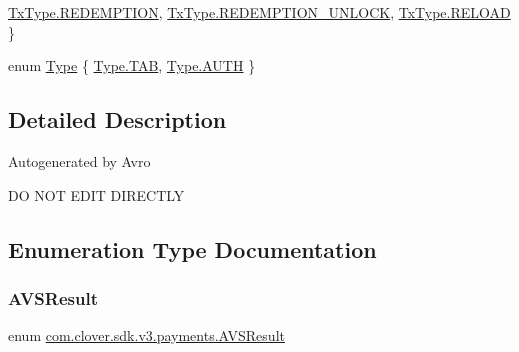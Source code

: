 \begin{DoxyCompactItemize}
\newline
\hyperlink{namespacecom_1_1clover_1_1sdk_1_1v3_1_1payments_ad4411d3ee4c0997584ff0df20764ba06a02c2455ac1707517c5138fb29aca4958}{Tx\+Type.\+R\+E\+D\+E\+M\+P\+T\+I\+ON}, 
\hyperlink{namespacecom_1_1clover_1_1sdk_1_1v3_1_1payments_ad4411d3ee4c0997584ff0df20764ba06a78a2c98bf2601eca6c830e18f06b5bdf}{Tx\+Type.\+R\+E\+D\+E\+M\+P\+T\+I\+O\+N\+\_\+\+U\+N\+L\+O\+CK}, 
\hyperlink{namespacecom_1_1clover_1_1sdk_1_1v3_1_1payments_ad4411d3ee4c0997584ff0df20764ba06a07d14e40a82f0a38be9b2d0e4f5f8278}{Tx\+Type.\+R\+E\+L\+O\+AD}
 \}
\item 
enum \hyperlink{namespacecom_1_1clover_1_1sdk_1_1v3_1_1payments_ab3a3c9595b671a87b6fe5f1920784b73}{Type} \{ \hyperlink{namespacecom_1_1clover_1_1sdk_1_1v3_1_1payments_ab3a3c9595b671a87b6fe5f1920784b73af684bf05fa3e81528c84d1d281d839f1}{Type.\+T\+AB}, 
\hyperlink{namespacecom_1_1clover_1_1sdk_1_1v3_1_1payments_ab3a3c9595b671a87b6fe5f1920784b73af458afcda462a9ed24f08634cb2ceced}{Type.\+A\+U\+TH}
 \}
\end{DoxyCompactItemize}


\subsection{Detailed Description}
Autogenerated by Avro

DO N\+OT E\+D\+IT D\+I\+R\+E\+C\+T\+LY 

\subsection{Enumeration Type Documentation}
\mbox{\label{namespacecom_1_1clover_1_1sdk_1_1v3_1_1payments_a81b51961db7fb2e8c34fefd28183a8a1}} 
\subsubsection{\texorpdfstring{A\+V\+S\+Result}{AVSResult}}
{\footnotesize\ttfamily enum \hyperlink{namespacecom_1_1clover_1_1sdk_1_1v3_1_1payments_a81b51961db7fb2e8c34fefd28183a8a1}{com.\+clover.\+sdk.\+v3.\+payments.\+A\+V\+S\+Result}\hspace{0.3cm}{\ttfamily [strong]}}

